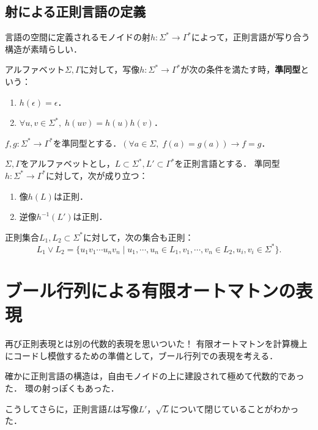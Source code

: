 \documentclass[uplatex, dvipdfmx]{jsreport}
\begin{document}
\subsection{射による正則言語の定義}

\begin{tcolorbox}[colframe=ForestGreen, colback=ForestGreen!10!white, breakable]
    言語の空間に定義されるモノイドの射$h:\Sigma^*\to\Gamma^*$によって，正則言語が写り合う構造が素晴らしい．
\end{tcolorbox}

\begin{definition}[モノイドの射]
    アルファベット$\Sigma,\Gamma$に対して，写像$h:\Sigma^*\to\Gamma^*$が次の条件を満たす時，\textbf{準同型}という：
    \begin{enumerate}
        \item $h(\epsilon)=\epsilon$．
        \item $\forall u,v\in\Sigma^*,\;h(uv)=h(u)h(v)$．
    \end{enumerate}
\end{definition}

\begin{proposition}[モノイドの基底]
    $f,g:\Sigma^*\to\Gamma^*$を準同型とする．$(\forall a\in\Sigma,\;f(a)=g(a))\rightarrow f=g$．
\end{proposition}

\begin{theorem}
    $\Sigma,\Gamma$をアルファベットとし，$L\subset\Sigma^*,L'\subset\Gamma^*$を正則言語とする．
    準同型$h:\Sigma^*\to\Gamma^*$に対して，次が成り立つ：
    \begin{enumerate}
        \item 像$h(L)$は正則．
        \item 逆像$h^{-1}(L')$は正則．
    \end{enumerate}
\end{theorem}

\begin{proposition}[shuffle]
    正則集合$L_1,L_2\subset\Sigma^*$に対して，次の集合も正則：
    \[ L_1\lor L_2=\{u_1v_1\cdots u_nv_n\mid u_1,\cdots,u_n\in L_1,v_1,\cdots,v_n\in L_2, u_i,v_i\in\Sigma^*\}. \]
\end{proposition}

\section{ブール行列による有限オートマトンの表現}

\begin{tcolorbox}[colframe=ForestGreen, colback=ForestGreen!10!white, breakable,
    title=算譜に特性関数のアイデアが使えるので，NFAはBool行列のデータ構造に翻訳できる]
    再び正則表現とは別の代数的表現を思いついた！
    有限オートマトンを計算機上にコードし模倣するための準備として，ブール行列での表現を考える．
    
    確かに正則言語の構造は，自由モノイドの上に建設されて極めて代数的であった．
    環の射っぽくもあった．

    こうしてさらに，正則言語$L$は写像$L'$，$\sqrt{L}$について閉じていることがわかった．
\end{tcolorbox}
\end{document}
